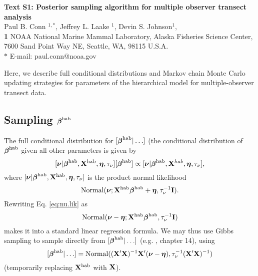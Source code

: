 \documentclass[10pt]{article}
\date{}
\begin{document}
\begin{flushleft}
{\Large
\textbf{Text S1: Posterior sampling algorithm for multiple observer transect analysis} }
\\
Paul B. Conn $^{1,\ast}$,
Jeffrey L. Laake $^{1}$,
Devin S. Johnson$^{1}$,
\\
{\bf{1}} NOAA National Marine Mammal Laboratory, Alaska Fisheries Science Center,
7600 Sand Point Way NE, Seattle, WA, 98115 U.S.A.
\\
$\ast$ E-mail: paul.conn@noaa.gov
\end{flushleft}


Here, we describe full conditional distributions and Markov chain Monte Carlo updating strategies for parameters of the hierarchical model for multiple-observer transect data.


\subsection*{Sampling $\boldsymbol{\beta}^{\rm hab}$}

The full conditional distribution for $[\boldsymbol{\beta}^{\rm hab}|\hdots]$ (the conditional distribution of $\boldsymbol{\beta}^{\rm hab}$ given all other parameters is given by
$$
    [\boldsymbol{\nu} | \boldsymbol{\beta}^{\rm hab},{\bf X}^{\rm hab},\boldsymbol{\eta},\tau_\nu][\boldsymbol{\beta}^{\rm hab}]\propto[\boldsymbol{\nu} | \boldsymbol{\beta}^{\rm hab},{\bf X}^{hab},\boldsymbol{\eta},\tau_\nu],
$$
where $ [\boldsymbol{\nu} | \boldsymbol{\beta}^{\rm hab},{\bf X}^{\rm hab},\boldsymbol{\eta},\tau_\nu]$
is the product normal likelihood
\begin{equation} \label{eq:nu.lik}
{\rm Normal}(\boldsymbol{\nu};{\bf X}^{\rm hab} \boldsymbol{\beta}^{\rm hab} +\boldsymbol{\eta},\tau_\nu^{-1}{\bf I}).
\end{equation}
Rewriting Eq. \ref{eq:nu.lik} as
$$
{\rm Normal}(\boldsymbol{\nu}-\boldsymbol{\eta};{\bf X}^{\rm hab}\boldsymbol{\beta}^{\rm hab} ,\tau_\nu^{-1}{\bf I})
$$
makes it into a standard linear regression formula. We may
thus use Gibbs sampling to sample directly from $[\boldsymbol{\beta}^{\rm hab}|\hdots]$ (e.g. \cite{GelmanEtAl2004}, chapter 14), using
\begin{equation}
\label{eq:beta.post}
[\boldsymbol{\beta}^{\rm hab}|\hdots]={\rm Normal}(({\bf X}^\prime {\bf X})^{-1}{\bf X}^\prime (\boldsymbol{\nu}-\boldsymbol{\eta}),\tau_\nu^{-1}({\bf X}^\prime {\bf X})^{-1})
\end{equation}
(temporarily replacing ${\bf X}^{\rm hab}$ with ${\bf X}$).
\end{document}
